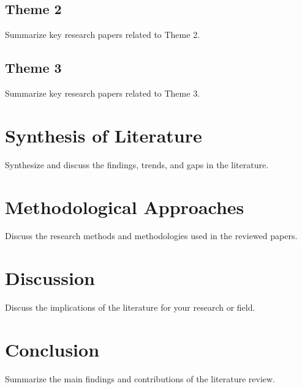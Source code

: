 \documentclass{article}
\begin{document}
\subsection{Theme 2}
Summarize key research papers related to Theme 2.

\subsection{Theme 3}
Summarize key research papers related to Theme 3.

\section{Synthesis of Literature}
Synthesize and discuss the findings, trends, and gaps in the literature.

\section{Methodological Approaches}
Discuss the research methods and methodologies used in the reviewed papers.

\section{Discussion}
Discuss the implications of the literature for your research or field.

\section{Conclusion}
Summarize the main findings and contributions of the literature review.

\citep{book_example}

\end{document}
